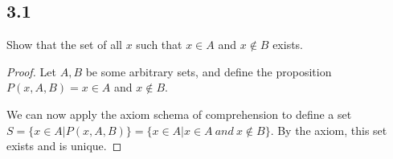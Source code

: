 \subsection*{3.1}

Show that the set of all $x$ such that $x \in A$ and $x \notin B$ exists.

\begin{proof}
Let $A, B$ be some arbitrary sets, and define the proposition $P(x, A, B) = x \in A $ and $x \notin B$.

We can now apply the axiom schema of comprehension to define a set $S = \{x \in A | P(x, A, B)\} = \{x \in A | x \in A~and~x \notin B\}$. By the axiom, this set exists and is unique.

\end{proof}



